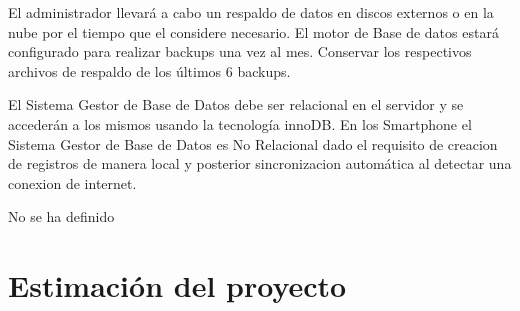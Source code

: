 
    El administrador llevará a cabo un respaldo de datos en discos externos o en la nube por el tiempo que el considere necesario. El motor de Base de datos estará configurado para realizar backups una vez al mes. Conservar los
    respectivos archivos de respaldo de los últimos 6 backups.


    El Sistema Gestor de Base de Datos debe ser relacional en el servidor y se accederán a los mismos usando la tecnología innoDB.
    En los Smartphone el Sistema Gestor de Base de Datos es No Relacional dado el requisito de creacion de registros de manera local y posterior sincronizacion automática al detectar una conexion de internet. 


    No se ha definido

  \section{Estimación del proyecto}